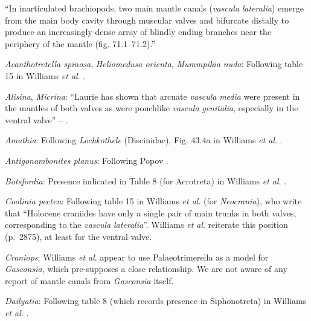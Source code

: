 \documentclass[openany]{book}
\theoremstyle{definition}
\theoremstyle{definition}
\theoremstyle{definition}
\theoremstyle{remark}
\begin{document}
``In inarticulated brachiopods, two main mantle canals (\emph{vascula}
\emph{lateralia}) emerge from the main body cavity through muscular
valves and bifurcate distally to produce an increasingly dense array of
blindly ending branches near the periphery of the mantle (fig.
71.1--71.2).''

\hypertarget{Acanthotretella_spinosa-coding-32}{}
\emph{Acanthotretella spinosa}, \emph{Heliomedusa orienta},
\emph{Mummpikia nuda}: Following table 15 in Williams \emph{et al}.
\citeyearpar{Williams2000LinguliformeaCraniiformea}.

\hypertarget{Alisina-coding-32}{}
\emph{Alisina}, \emph{Micrina}: ``Laurie
\citeyearpar{Laurie1987Themusculature} has shown that arcuate
\emph{vascula} \emph{media} were present in the mantles of both valves
as were pouchlike \emph{vascula} \emph{genitalia}, especially in the
ventral valve'' -- \citet{Williams1997Introduction}.

\hypertarget{Amathia-coding-32}{}
\emph{Amathia}: Following \emph{Lochkothele} (Discinidae), Fig. 43.4a in
Williams \emph{et al}.
\citeyearpar{Williams2000LinguliformeaCraniiformea}.

\hypertarget{Antigonambonites_planus-coding-32}{}
\emph{Antigonambonites planus}: Following Popov
\citeyearpar{Popov1992TheCambrian}.

\hypertarget{Botsfordia-coding-32}{}
\emph{Botsfordia}: Presence indicated in Table 8 (for Acrotreta) in
Williams \emph{et al}.
\citeyearpar{Williams2000LinguliformeaCraniiformea}.

\hypertarget{Coolinia_pecten-coding-32}{}
\emph{Coolinia pecten}: Following table 15 in Williams \emph{et al}.
\citeyearpar{Williams2000LinguliformeaCraniiformea} (for
\emph{Neocrania}), who write that ``Holocene craniides have only a
single pair of main trunks in both valves, corresponding to the
\emph{vascula} \emph{lateralia}''. Williams \emph{et al}.
\citeyearpar{Williams2007Supplement} reiterate this position (p.~2875),
at least for the ventral valve.

\hypertarget{Craniops-coding-32}{}
\emph{Craniops}: Williams \emph{et al}. \citeyearpar[table
15]{Williams2000LinguliformeaCraniiformea} appear to use
Palaeotrimerella \citep[as drawn in][]{Williams1997Introduction} as a
model for \emph{Gasconsia}, which pre-supposes a close relationship. We
are not aware of any report of mantle canals from \emph{Gasconsia}
itself.

\hypertarget{Dailyatia-coding-32}{}
\emph{Dailyatia}: Following table 8 (which records presence in
Siphonotreta) in Williams \emph{et al}.
\citeyearpar{Williams2000LinguliformeaCraniiformea}.
\end{document}
